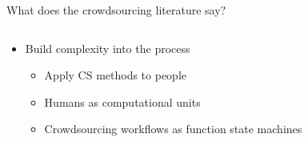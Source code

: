 \documentclass[presentation]{subfiles}
\begin{document}
\begin{frame}{What does the crowdsourcing literature say?}
\begin{columns}
  \begin{column}{0.6\textwidth}
    \begin{itemize}
      \item Build complexity into the process
      \begin{itemize}
        \item<1> Apply CS methods to people\\
        \scriptsize{
          \textcite{crowdForgeKittur}
        }
        \item<2> Humans as computational units\\
        \scriptsize{
          \textcite{Lasecki:2014:LSR:2661334.2661352}
        }
        \item<3> Crowdsourcing workflows as function state machines\\
        \scriptsize{\textcite{latoza2014microtask}
        }
      \end{itemize}
    \end{itemize}
  \end{column}
  
  \begin{column}{0.4\textwidth}
    \begin{figure}
    

\end{figure}
\end{column}
\end{columns}
\end{frame}
\end{document}
